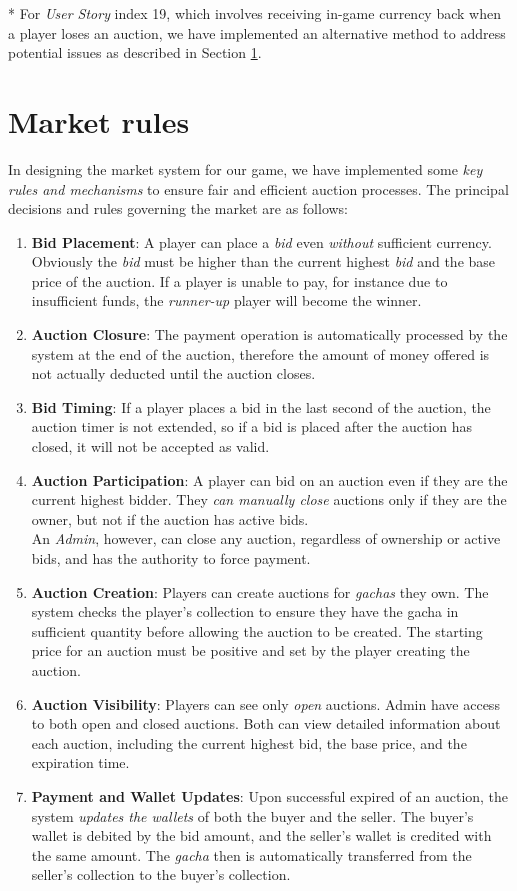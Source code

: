 \documentclass{article}
\begin{document}
* For \emph{User Story} index 19, which involves receiving in-game currency back when a player loses an auction, we have implemented an alternative method to address potential issues as described in Section \ref{sec:market_rules}.

\newpage

\section{Market rules} \label{sec:market_rules}
In designing the market system for our game, we have implemented some \emph{key rules and mechanisms} to ensure fair and efficient auction processes. The principal decisions and rules governing the market are as follows:
\begin{enumerate}
    \item \textbf{Bid Placement}: A player can place a \emph{bid} even \emph{without} sufficient currency. Obviously the \emph{bid} must be higher than the current highest \emph{bid} and the base price of the auction. If a player is unable to pay, for instance due to insufficient funds, the \emph{runner-up} player will become the winner.
    \item \textbf{Auction Closure}: The payment operation is automatically processed by the system at the end of the auction, therefore the amount of money offered is not actually deducted until the auction closes.
    \item \textbf{Bid Timing}: If a player places a bid in the last second of the auction, the auction timer is not extended, so if a bid is placed after the auction has closed, it will not be accepted as valid.
    \item \textbf{Auction Participation}: A player can bid on an auction even if they are the current highest bidder. They \emph{can manually close} auctions only if they are the owner, but not if the auction has active bids. \\
An \emph{Admin}, however, can close any auction, regardless of ownership or active bids, and has the authority to force payment.
    \item \textbf{Auction Creation}: Players can create auctions for \emph{gachas} they own. The system checks the player's collection to ensure they have the gacha in sufficient quantity before allowing the auction to be created. The starting price for an auction must be positive and set by the player creating the auction.
    \item \textbf{Auction Visibility}: Players can see only \emph{open} auctions. Admin have access to both open and closed auctions. Both can view detailed information about each auction, including the current highest bid, the base price, and the expiration time.
    \item \textbf{Payment and Wallet Updates}: Upon successful expired of an auction, the system \emph{updates the wallets} of both the buyer and the seller. The buyer's wallet is debited by the bid amount, and the seller's wallet is credited with the same amount. The \emph{gacha} then is automatically transferred from the seller's collection to the buyer's collection.
\end{enumerate}
\end{document}
